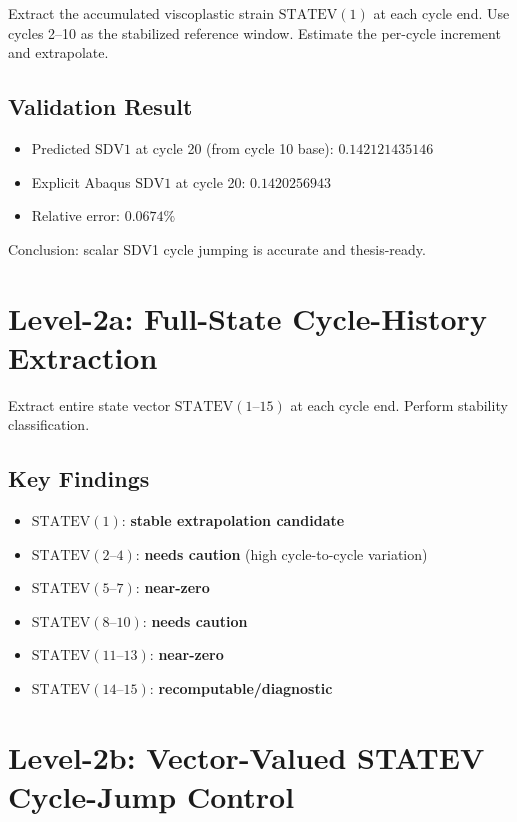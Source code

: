 \documentclass[11pt]{article}
\begin{document}
Extract the accumulated viscoplastic strain $\text{STATEV}(1)$ at each cycle end.  Use cycles 2--10 as the stabilized reference window. Estimate the per-cycle increment and extrapolate.

\subsection{Validation Result}
\begin{itemize}
  \item Predicted $\text{SDV1}$ at cycle 20 (from cycle 10 base): $0.142121435146$
  \item Explicit Abaqus $\text{SDV1}$ at cycle 20: $0.1420256943$
  \item Relative error: $0.0674\%$
\end{itemize}

Conclusion: scalar SDV1 cycle jumping is accurate and thesis-ready.

\section{Level-2a: Full-State Cycle-History Extraction}

Extract entire state vector $\text{STATEV}(1\text{--}15)$ at each cycle end. Perform stability classification.

\subsection{Key Findings}
\begin{itemize}
  \item $\text{STATEV}(1)$: \textbf{stable extrapolation candidate}
  \item $\text{STATEV}(2\text{--}4)$: \textbf{needs caution} (high cycle-to-cycle variation)
  \item $\text{STATEV}(5\text{--}7)$: \textbf{near-zero}
  \item $\text{STATEV}(8\text{--}10)$: \textbf{needs caution}
  \item $\text{STATEV}(11\text{--}13)$: \textbf{near-zero}
  \item $\text{STATEV}(14\text{--}15)$: \textbf{recomputable/diagnostic}
\end{itemize}

\section{Level-2b: Vector-Valued STATEV Cycle-Jump Control}
\end{document}
